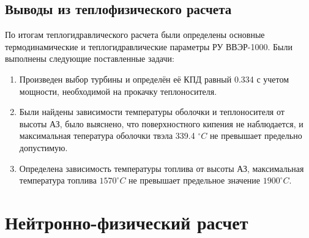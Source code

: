 \subsection{Выводы из теплофизического расчета}
По итогам теплогидравлического расчета были определены основные термодинамические и теплогидравлические параметры РУ ВВЭР-1000. Были выполнены следующие поставленные задачи:
\begin{enumerate}
   \item Произведен выбор турбины и определён её КПД равный 0.334 с учетом мощности, необходимой на прокачку теплоносителя.
   \item Были найдены зависимости температуры оболочки и теплоносителя от высоты АЗ, было выяснено, что поверхностного кипения не наблюдается, и максимальная тепература оболочки твэла 339.4 $^\circ C$ не превышает предельно допустимую.
   \item Определена зависимость температуры топлива от высоты АЗ, максимальная температура топлива $1570 ^\circ C$ не превышает предельное значение $1900 ^\circ C$.
\end{enumerate}

\section{Нейтронно-физический расчет}

